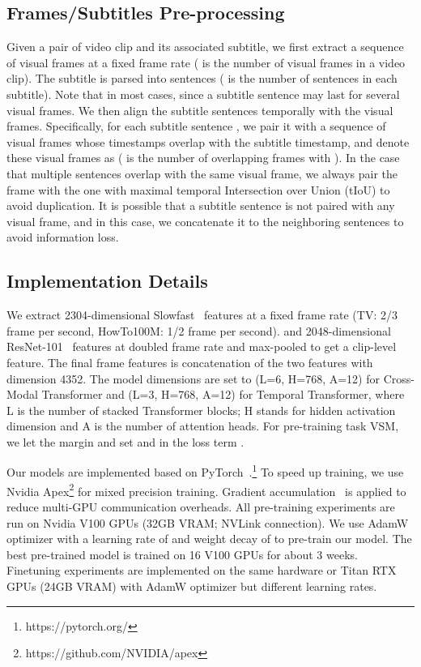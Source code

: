 \documentclass[11pt,a4paper]{article}
\begin{document}
\subsection{Frames/Subtitles Pre-processing} \label{app: pairing}
Given a pair of video clip and its associated subtitle, we first extract a sequence of visual frames  at a fixed frame rate ( is the number of visual frames in a video clip). The subtitle is parsed into sentences  ( is the number of sentences in each subtitle). Note that  in most cases, since a subtitle sentence may last for several visual frames. We then align the subtitle sentences temporally with the visual frames. Specifically, for each subtitle sentence , we pair it with a sequence of visual frames whose timestamps overlap with the subtitle timestamp, and denote these visual frames as  ( is the number of overlapping frames with ). In the case that multiple sentences overlap with the same visual frame, we always pair the frame with the one with maximal temporal Intersection over Union (tIoU) to avoid duplication. It is possible that a subtitle sentence is not paired with any visual frame, and in this case, we concatenate it to the neighboring sentences to avoid information loss. 
\subsection{Implementation Details}
We extract 2304-dimensional Slowfast~\citep{feichtenhofer2019slowfast} features at a fixed frame rate (TV: 2/3 frame per second, HowTo100M: 1/2 frame per second). and 2048-dimensional ResNet-101~\citep{he2016deep} features at doubled frame rate and max-pooled to get a clip-level feature. The final frame features is  concatenation of the two features with dimension 4352. The model dimensions are set to (L=6, H=768, A=12) for Cross-Modal Transformer and (L=3, H=768, A=12) for Temporal Transformer, where L is the number of stacked Transformer blocks; H stands for hidden activation dimension and A is the number of attention heads. For pre-training task VSM, we let the margin  and set  and  
in the loss term .

Our models are implemented based on PyTorch~\citep{paszke2017automatic}.\footnote{https://pytorch.org/} To speed up training, we use Nvidia Apex\footnote{https://github.com/NVIDIA/apex} for mixed precision training. Gradient accumulation~\cite{ott2018scaling} is applied to reduce multi-GPU communication overheads.
All pre-training experiments are run on Nvidia V100 GPUs (32GB VRAM; NVLink connection). We use AdamW optimizer \cite{AdamW} with a learning rate of  and weight decay of  to pre-train our model. The best pre-trained model is trained on 16 V100 GPUs for about 3 weeks. Finetuning experiments are implemented on the same hardware or Titan RTX GPUs (24GB VRAM) with AdamW optimizer but different learning rates.  
\end{document}
